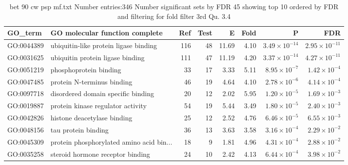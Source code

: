\begin{table}[ht]
\centering
\begin{tabular}{llrrrrrr}
  \hline
GO\_term & GO molecular function complete & Ref & Test & E & Fold & P & FDR \\ 
  \hline
GO:0044389 & ubiquitin-like protein ligase binding  & 116 & 48 & 11.69 & 4.10 & $3.49 \times 10^{-14}$ & $2.95 \times 10^{-11}$ \\ 
  GO:0031625 & ubiquitin protein ligase binding  & 111 & 47 & 11.19 & 4.20 & $3.37 \times 10^{-14}$ & $4.27 \times 10^{-11}$ \\ 
  GO:0051219 & phosphoprotein binding  & 33 & 17 & 3.33 & 5.11 & $8.95 \times 10^{-7}$ & $1.42 \times 10^{-4}$ \\ 
  GO:0047485 & protein N-terminus binding  & 46 & 19 & 4.64 & 4.10 & $2.78 \times 10^{-6}$ & $4.14 \times 10^{-4}$ \\ 
  GO:0097718 & disordered domain specific binding  & 20 & 12 & 2.02 & 5.95 & $1.20 \times 10^{-5}$ & $1.69 \times 10^{-3}$ \\ 
  GO:0019887 & protein kinase regulator activity  & 54 & 19 & 5.44 & 3.49 & $1.80 \times 10^{-5}$ & $2.40 \times 10^{-3}$ \\ 
  GO:0042826 & histone deacetylase binding  & 25 & 12 & 2.52 & 4.76 & $6.46 \times 10^{-5}$ & $6.55 \times 10^{-3}$ \\ 
  GO:0048156 & tau protein binding  & 36 & 13 & 3.63 & 3.58 & $3.16 \times 10^{-4}$ & $2.29 \times 10^{-2}$ \\ 
  GO:0045309 & protein phosphorylated amino acid bin... & 18 & 9 & 1.81 & 4.96 & $4.31 \times 10^{-4}$ & $2.88 \times 10^{-2}$ \\ 
  GO:0035258 & steroid hormone receptor binding  & 24 & 10 & 2.42 & 4.13 & $6.44 \times 10^{-4}$ & $3.98 \times 10^{-2}$ \\ 
  \hline
\end{tabular}
\caption{bet 90 cw psp mf.txt Number entries:346 Number significant sets by FDR 45 showing top 10 ordered by FDR and filtering for fold filter 3rd Qu. 3.4} 
\label{tab:bet 90 cw psp mf.txt Number entries:346 Number significant sets by FDR 45 showing top 10 ordered by FDR and filtering for fold filter 3rd Qu. 3.4}
\end{table}
